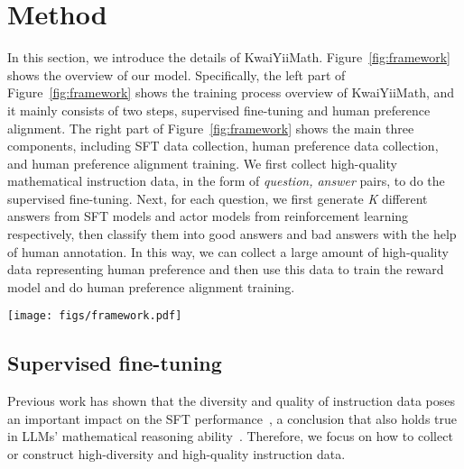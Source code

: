 \documentclass{article}
\begin{document}
\section{Method}
In this section, we introduce the details of KwaiYiiMath.
Figure~\ref{fig:framework} shows the overview of our model.
Specifically, the left part of Figure~\ref{fig:framework} shows the training process overview of KwaiYiiMath, and it mainly consists of two steps, supervised fine-tuning and human preference alignment.
The right part of Figure~\ref{fig:framework} shows the main three components, including SFT data collection, human preference data collection, and human preference alignment training.
We first collect high-quality mathematical instruction data, in the form of \textit{question, answer} pairs, to do the supervised fine-tuning.
Next, for each question, we first generate \emph{K} different answers from SFT models and actor models from reinforcement learning respectively, then classify them into good answers and bad answers with the help of human annotation.
In this way, we can collect a large amount of high-quality data representing human preference and then use this data to train the reward model and do human preference alignment training.

\begin{figure*}[!t]
    \centering
    \texttt{[image: figs/framework.pdf]}
    \caption{The overview of KwaiYiiMath. The left part is the framework of the model training process. The right part shows the details of three main components, including the SFT data collection, human preference data collection, and human preference alignment training. The data used by RM, PPO, and DPO are only in the same form and collection method, but their training datasets are different.}
    \label{fig:framework}
\end{figure*}


\subsection{Supervised fine-tuning}
Previous work has shown that the diversity and quality of instruction data poses an important impact on the SFT performance~\cite{zhou2023lima,peng2023instruction,chen2023alpagasus}, a conclusion that also holds true in LLMs' mathematical reasoning ability~\cite{yuan2023scaling,luo2023wizardmath,abel,yu2023metamath}. Therefore, we focus on how to collect or construct high-diversity and high-quality instruction data. 
\end{document}
